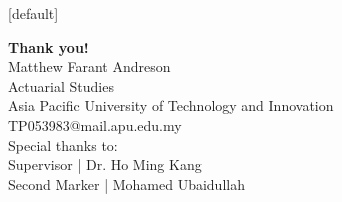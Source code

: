 \documentclass[aspectratio=169]{beamer}
\begin{document}
\makeatletter 
    [default]
    \def\beamer@entrycode{\vspace*{-\headheight}}
\makeatother
\begin{frame}{}
    \centering \Large
    \textbf{Thank you!} \\
    \vspace{10pt}
    \small
    Matthew Farant Andreson\\
    Actuarial Studies\\
    Asia Pacific University of Technology and Innovation\\
    TP053983@mail.apu.edu.my\\
    \vspace{10pt}
    Special thanks to:\\
    Supervisor | Dr. Ho Ming Kang\\
    Second Marker | Mohamed Ubaidullah
\end{frame}
\end{document}
